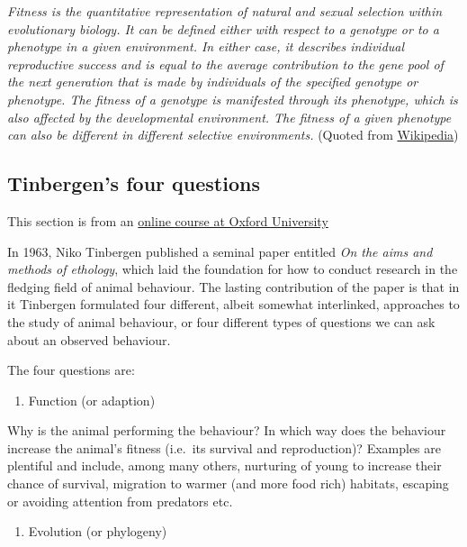 \documentclass[
  letterpaper,
  DIV=11,
  numbers=noendperiod]{scrreprt}
\providecommand{\tightlist}{%
  \setlength{\itemsep}{0pt}\setlength{\parskip}{0pt}}
\begin{document}
\emph{Fitness is the quantitative representation of natural and sexual
selection within evolutionary biology. It can be defined either with
respect to a genotype or to a phenotype in a given environment. In
either case, it describes individual reproductive success and is equal
to the average contribution to the gene pool of the next generation that
is made by individuals of the specified genotype or phenotype. The
fitness of a genotype is manifested through its phenotype, which is also
affected by the developmental environment. The fitness of a given
phenotype can also be different in different selective environments.}
(Quoted from
\href{https://en.wikipedia.org/w/index.php?title=Fitness_(biology)&oldid=1137795350}{Wikipedia})

\subsection{Tinbergen's four questions}\label{tinbergens-four-questions}

This section is from an
\href{https://www.conted.ox.ac.uk/courses/samples/animal-behaviour-an-introduction-online/index.html}{online
course at Oxford University}

In 1963, Niko Tinbergen published a seminal paper entitled \emph{On the
aims and methods of ethology}, which laid the foundation for how to
conduct research in the fledging field of animal behaviour. The lasting
contribution of the paper is that in it Tinbergen formulated four
different, albeit somewhat interlinked, approaches to the study of
animal behaviour, or four different types of questions we can ask about
an observed behaviour.

The four questions are:

\begin{enumerate}
\def\labelenumi{\arabic{enumi}.}
\tightlist
\item
  Function (or adaption)
\end{enumerate}

Why is the animal performing the behaviour? In which way does the
behaviour increase the animal's fitness (i.e.~its survival and
reproduction)? Examples are plentiful and include, among many others,
nurturing of young to increase their chance of survival, migration to
warmer (and more food rich) habitats, escaping or avoiding attention
from predators etc.

\begin{enumerate}
\def\labelenumi{\arabic{enumi}.}
\setcounter{enumi}{1}
\tightlist
\item
  Evolution (or phylogeny)
\end{enumerate}
\end{document}
